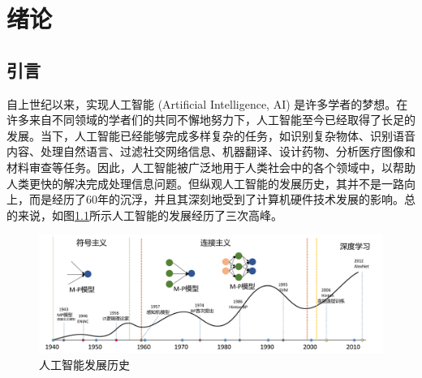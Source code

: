 
\chapter{绪论}

\section{引言}

自上世纪以来，实现人工智能 (Artificial Intelligence, AI) 是许多学者的梦想。在许多来自不同领域的学者们的共同不懈地努力下，人工智能至今已经取得了长足的发展。当下，人工智能已经能够完成多样复杂的任务，如识别复杂物体\cite{he2016deep}、识别语音内容\cite{luong2015effective}、处理自然语言\cite{amodei2016end}、过滤社交网络信息、机器翻译\cite{bahdanau2014neural}、设计药物、分析医疗图像\cite{esteva2017dermatologist}和材料审查等任务。因此，人工智能被广泛地用于人类社会中的各个领域中，以帮助人类更快的解决完成处理信息问题。但纵观人工智能的发展历史，其并不是一路向上，而是经历了60年的沉浮，并且其深刻地受到了计算机硬件技术发展的影响。总的来说，如图\ref{devlop}所示人工智能的发展经历了三次高峰。

\begin{figure}[ht]
	\centering
	\includegraphics[width=1\textwidth]{figures/development.pdf}
	\caption{人工智能发展历史}
	\label{devlop}
\end{figure}

